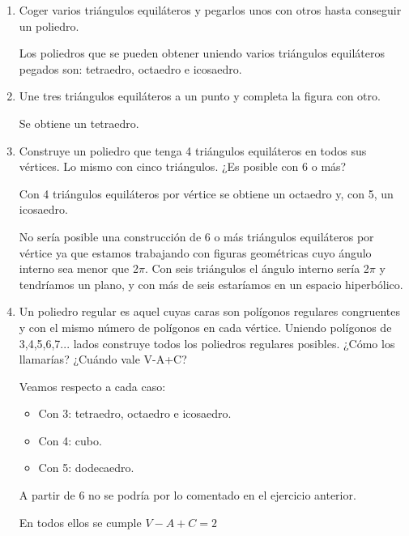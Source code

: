 \begin{enumerate}
	\item Coger varios triángulos equiláteros y pegarlos unos con otros hasta conseguir un poliedro.
	
	Los poliedros que se pueden obtener uniendo varios triángulos equiláteros pegados son: tetraedro, octaedro e icosaedro.
	
	\item Une tres triángulos equiláteros a un punto y completa la figura con otro.
	
	Se obtiene un tetraedro.
	
	\item Construye un poliedro que tenga 4 triángulos equiláteros en todos sus vértices. Lo mismo con cinco triángulos. ¿Es posible con 6 o más?
	
	Con 4 triángulos equiláteros por vértice se obtiene un octaedro y, con 5, un icosaedro.
	
	No sería posible una construcción de 6 o más triángulos equiláteros por vértice ya que estamos trabajando con figuras geométricas cuyo ángulo interno sea menor que 2$\pi$. Con seis triángulos el ángulo interno sería 2$\pi$ y tendríamos un plano, y con más de seis estaríamos en un espacio hiperbólico.
	
	\item Un poliedro regular es aquel cuyas caras son polígonos regulares congruentes y con el mismo número de polígonos en cada vértice. Uniendo polígonos de 3,4,5,6,7... lados construye todos los poliedros regulares posibles. ¿Cómo los llamarías? ¿Cuándo vale V-A+C?
	
	Veamos respecto a cada caso:
	
	\begin{itemize}
		\item Con 3: tetraedro, octaedro e icosaedro.
		\item Con 4: cubo.
		\item Con 5: dodecaedro.
	\end{itemize}
	
	A partir de 6 no se podría por lo comentado en el ejercicio anterior.
	
	En todos ellos se cumple $V-A+C=2$
	
\end{enumerate}

